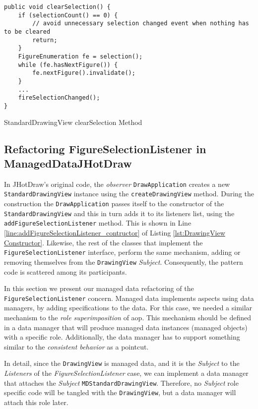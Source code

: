 \begin{sourcecode}
	\begin{lstlisting}[language=AspectJ, escapechar=|]
public void clearSelection() {
	if (selectionCount() == 0) {
		// avoid unnecessary selection changed event when nothing has to be cleared
		return;
	}
	FigureEnumeration fe = selection();
	while (fe.hasNextFigure()) {
		fe.nextFigure().invalidate();
	}
	...
	fireSelectionChanged();
}
	\end{lstlisting}
	\caption{StandardDrawingView clearSelection Method}
	\label{lst:StandardDrawingView clearSelection Method}
\end{sourcecode}

\subsection{Refactoring FigureSelectionListener in ManagedDataJHotDraw}
In JHotDraw's original code, the \textit{observer} \texttt{DrawApplication} creates a new \texttt{StandardDrawingView} instance using the \texttt{createDrawingView} method.
During the construction the \texttt{DrawApplication} passes itself to the constructor of the \texttt{StandardDrawingView} and this in turn adds it to its listeners list, using the \texttt{addFigureSelectionListener} method.
This is shown in Line \ref{line:addFigureSelectionListener_contructor} of Listing \ref{lst:DrawingView Constructor}.
Likewise, the rest of the classes that implement the \texttt{FigureSelectionListener} interface, perform the same mechanism, adding or removing themselves from the \texttt{DrawingView} \textit{Subject}.
Consequently, the pattern code is scattered among its participants.

In this section we present our managed data refactoring of the \texttt{FigureSelectionListener} concern.
Managed data implements aspects using data managers, by adding specifications to the data.
For this case, we needed a similar mechanism to the \textit{role superimposition} of \ac{aop}.
This mechanism should be defined in a data manager that will produce managed data instances (managed objects) with a specific role.
Additionally, the data manager has to support something similar to the \textit{consistent behavior} as a pointcut.

In detail, since the \texttt{DrawingView} is managed data, and it is the \textit{Subject} to the \textit{Listeners} of the \textit{FigureSelectionListener} case, we can implement a data manager that attaches the \textit{Subject} \texttt{MDStandardDrawingView}.
Therefore, no \textit{Subject} role specific code will be tangled with the \texttt{DrawingView}, but a data manager will attach this role later.

